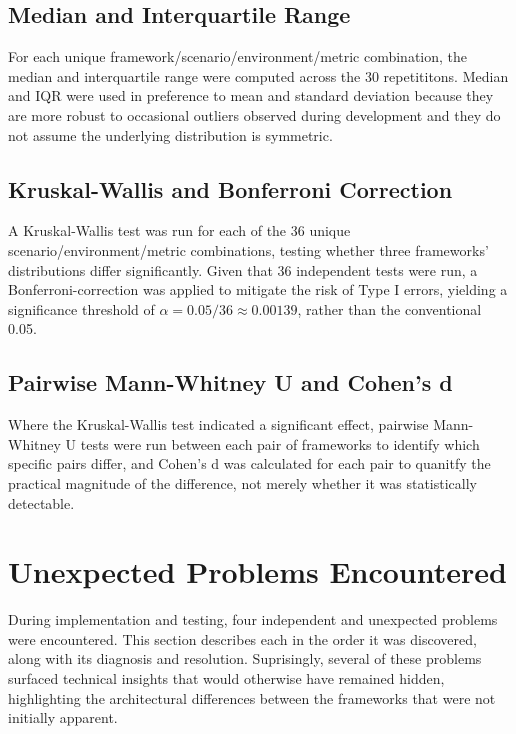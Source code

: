 \documentclass[11pt,a4paper]{report}
\begin{document}
\subsection{Median and Interquartile Range}

For each unique framework/scenario/environment/metric combination, the median and interquartile range were computed across the 30 repetititons. Median and IQR were used in preference to mean and standard deviation because they are more robust to occasional outliers observed during development and they do not assume the underlying distribution is symmetric. 

\subsection{Kruskal-Wallis and Bonferroni Correction}

A Kruskal-Wallis test was run for each of the 36 unique scenario/environment/metric combinations, testing whether three frameworks' distributions differ significantly. Given that 36 independent tests were run, a Bonferroni-correction was applied to mitigate the risk of Type I errors, yielding a significance threshold of $\alpha = 0.05 / 36 \approx 0.00139$, rather than the conventional 0.05. 

\subsection{Pairwise Mann-Whitney U and Cohen's d}

Where the Kruskal-Wallis test indicated a significant effect, pairwise Mann-Whitney U tests were run between each pair of frameworks to identify which specific pairs differ, and Cohen's d was calculated for each pair to quanitfy the practical magnitude of the difference, not merely whether it was statistically detectable.

\section{Unexpected Problems Encountered}
During implementation and testing, four independent and unexpected problems were encountered. This section describes each in the order it was discovered, along with its diagnosis and resolution. Suprisingly, several of these problems surfaced technical insights that would otherwise have remained hidden, highlighting the architectural differences between the frameworks that were not initially apparent.
\end{document}
